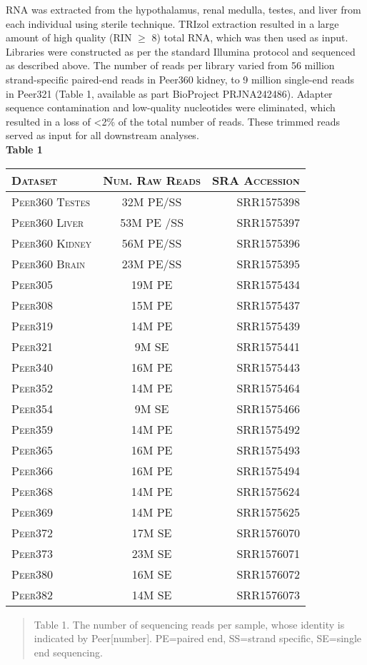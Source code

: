 \documentclass[12pt]{article}
\begin{document}
RNA was extracted from the hypothalamus, renal medulla, testes, and liver from each individual using sterile technique. TRIzol extraction resulted in a large amount of high quality (RIN $\geq$ 8) total RNA, which was then used as input. Libraries were constructed as per the standard Illumina protocol and sequenced as described above. The number of reads per library varied from 56 million strand-specific paired-end reads in Peer360 kidney, to 9 million single-end reads in Peer321 (\hypertarget{Table 1}{Table 1}, available as part BioProject PRJNA242486). Adapter sequence contamination and low-quality nucleotides were eliminated, which resulted in a loss of \textless 2\% of the total number of reads. These trimmed reads served as input for all downstream analyses. \\
\textbf{\hypertarget{Table 1}{Table 1}} \\
\begin{center}
\begin{tabular}{l|c | r}
\textsc{Dataset}& \textsc{Num. Raw Reads} & \textsc{SRA Accession} \\
\hline 
\textsc{Peer360 Testes} & 32M PE/SS  & SRR1575398 \\
\textsc{Peer360 Liver} & 53M PE /SS & SRR1575397 \\
\textsc{Peer360 Kidney} & 56M PE/SS  & SRR1575396 \\
\textsc{Peer360 Brain}  & 23M PE/SS & SRR1575395\\
\textsc{Peer305}  & 19M PE  & SRR1575434  \\
\textsc{Peer308}  & 15M PE  & SRR1575437 \\
\textsc{Peer319}  & 14M PE  & SRR1575439\\
\textsc{Peer321}  & 9M SE  & SRR1575441 \\
\textsc{Peer340}  & 16M PE  & SRR1575443 \\
\textsc{Peer352}  & 14M PE  & SRR1575464 \\
\textsc{Peer354}  & 9M SE  & SRR1575466 \\
\textsc{Peer359}  & 14M PE  & SRR1575492 \\
\textsc{Peer365}  & 16M PE & SRR1575493 \\
\textsc{Peer366}  & 16M PE & SRR1575494 \\
\textsc{Peer368}  & 14M PE  & SRR1575624\\
\textsc{Peer369}  & 14M PE  & SRR1575625\\
\textsc{Peer372}  & 17M SE  & SRR1576070\\
\textsc{Peer373}  & 23M SE  & SRR1576071\\
\textsc{Peer380}  & 16M SE  & SRR1576072 \\
\textsc{Peer382}  & 14M SE  & SRR1576073 \\
\end{tabular}
\begin{quote}
\small{Table 1. The number of sequencing reads per sample, whose identity is indicated by Peer[number]. PE=paired end, SS=strand specific, SE=single end sequencing. }
\end{quote}
\end{center}
\end{document}
